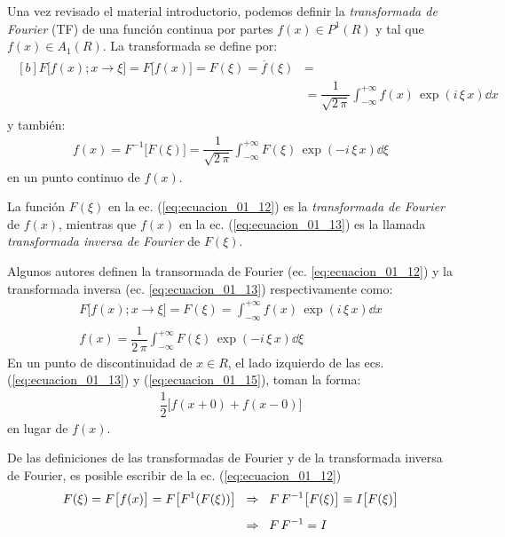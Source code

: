 Una vez revisado el material introductorio, podemos definir la \emph{transformada de Fourier} (TF) de una función continua por partes $f(x) \in P^{1} (R)$ y tal que $f(x) \in A_{1} (R)$. La transformada se define por:
\begin{align}
\begin{aligned}[b]
F \big[ f(x); x \to \xi \big] = F \big[f(x) \big] = F(\xi) = \overline{f} (\xi) &= \\[0.5em] 
&= \dfrac{1}{\sqrt{2 \, \pi}} \int_{-\infty}^{+\infty} f(x) \, \exp(i \, \xi \, x) \dd{x}
\end{aligned}
\label{eq:ecuacion_01_12}
\end{align}
y también:
\begin{align}
f(x) = F^{-1} \big[ F(\xi) \big] = \dfrac{1}{\sqrt{2 \, \pi}} \int_{-\infty}^{+\infty} F(\xi) \, \exp(-i \, \xi \, x) \dd{\xi}
\label{eq:ecuacion_01_13}
\end{align}
en un punto continuo de $f(x)$.
\par
La función $F(\xi)$ en la ec. (\ref{eq:ecuacion_01_12}) es la \emph{transformada de Fourier} de $f(x)$, mientras que $f(x)$ en la ec. (\ref{eq:ecuacion_01_13}) es la llamada \emph{transformada inversa de Fourier} de $F(\xi)$.
\par
Algunos autores definen la transormada de Fourier  (ec. \ref{eq:ecuacion_01_12}) y la transformada inversa (ec. \ref{eq:ecuacion_01_13}) respectivamente como:
\begin{align}
F \big[ f(x); x \to \xi \big] = F(\xi) = \int_{-\infty}^{+\infty} f(x) \, \exp(i \, \xi \, x) \dd{x} \label{eq:ecuacion_01_14} \\[0.5em]
f(x) = \dfrac{1}{2 \, \pi} \int_{-\infty}^{+\infty} F(\xi) \, \exp(-i \, \xi \, x) \dd{\xi}
\label{eq:ecuacion_01_15}
\end{align}
En un punto de discontinuidad de $x \in R$, el lado izquierdo de las ecs. (\ref{eq:ecuacion_01_13}) y (\ref{eq:ecuacion_01_15}), toman la forma:
\begin{align*}
\dfrac{1}{2} \big[ f(x + 0) + f(x - 0) \big]
\end{align*}
en lugar de $f(x)$.
\par
De las definiciones de las transformadas de Fourier y de la transformada inversa de Fourier, es posible escribir de la ec. (\ref{eq:ecuacion_01_12})
\begin{align*}
F(\xi) = F \big[f(x) \big] = F \big[ F^{1} (F(\xi))\big] \hspace{0.2cm} &\Rightarrow \hspace{0.2cm} F \, F^{-1} \big[ F(\xi)\big] \equiv I \big[ F(\xi)\big] \\[0.5em]
&\Rightarrow \hspace{0.2cm} F \, F^{-1} = I
\end{align*}
